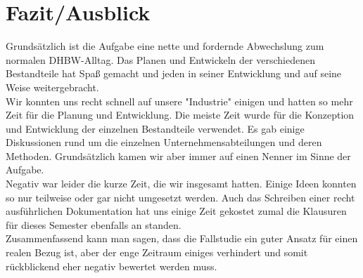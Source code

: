 \clearpage
\chapter{Fazit/Ausblick}
Grundsätzlich ist die Aufgabe eine nette und fordernde Abwechslung zum normalen DHBW-Alltag. Das Planen und Entwickeln der verschiedenen Bestandteile hat Spaß gemacht und jeden in seiner Entwicklung und auf seine Weise weitergebracht.\\
Wir konnten uns recht schnell auf unsere "Industrie" einigen und hatten so mehr Zeit für die Planung und Entwicklung. Die meiste Zeit wurde für die Konzeption und Entwicklung der einzelnen Bestandteile verwendet. Es gab einige Diskussionen rund um die einzelnen Unternehmensabteilungen und deren Methoden. Grundsätzlich kamen wir aber immer auf einen Nenner im Sinne der Aufgabe.\\
Negativ war leider die kurze Zeit, die wir insgesamt hatten. Einige Ideen konnten so nur teilweise oder gar nicht umgesetzt werden. Auch das Schreiben einer recht ausführlichen Dokumentation hat uns einige Zeit gekostet zumal die Klausuren für dieses Semester ebenfalls an standen.\\   
Zusammenfassend kann man sagen, dass die Fallstudie ein guter Ansatz für einen realen Bezug ist, aber der enge Zeitraum einiges verhindert und somit rückblickend eher negativ bewertet werden muss.  